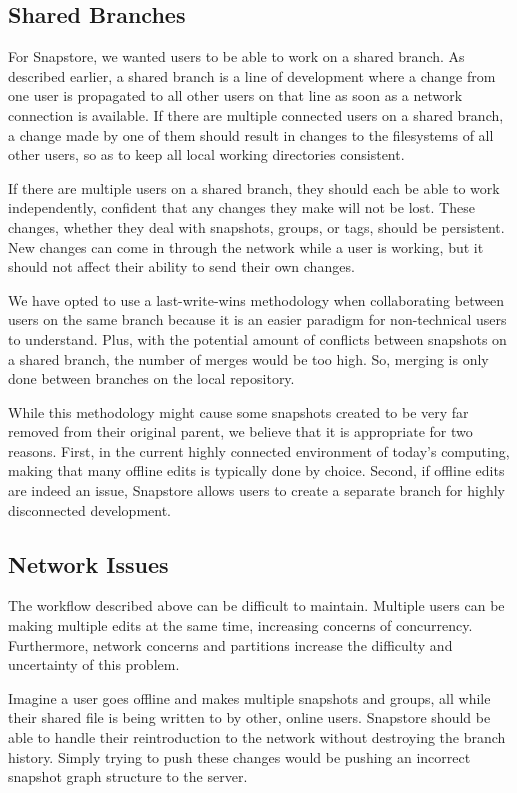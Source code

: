 \subsection{Shared Branches}

For Snapstore, we wanted users to be able to work on a shared branch. As described earlier, a shared branch is a line of development where a change from one user is propagated to all other users on that line as soon as a network connection is available. If there are multiple connected users on a shared branch, a change made by one of them should result in changes to the filesystems of all other users, so as to keep all local working directories consistent.

If there are multiple users on a shared branch, they should each be able to work independently, confident that any changes they make will not be lost. These changes, whether they deal with snapshots, groups, or tags, should be persistent. New changes can come in through the network while a user is working, but it should not affect their ability to send their own changes.

We have opted to use a last-write-wins methodology when collaborating between users on the same branch because it is an easier paradigm for non-technical users to understand. Plus, with the potential amount of conflicts between snapshots on a shared branch, the number of merges would be too high. So, merging is only done between branches on the local repository.

While this methodology might cause some snapshots created to be very far removed from their original parent, we believe that it is appropriate for two reasons. First, in the current highly connected environment of today's computing, making that many offline edits is typically done by choice. Second, if offline edits are indeed an issue, Snapstore allows users to create a separate branch for highly disconnected development. 

\subsection{Network Issues}

The workflow described above can be difficult to maintain. Multiple users can be making multiple edits at the same time, increasing concerns of concurrency.  Furthermore, network concerns and partitions increase the difficulty and uncertainty of this problem. 

Imagine a user goes offline and makes multiple snapshots and groups, all while their shared file is being written to by other, online users. Snapstore should be able to handle their reintroduction to the network without destroying the branch history. Simply trying to push these changes would be pushing an incorrect snapshot graph structure to the server. 

